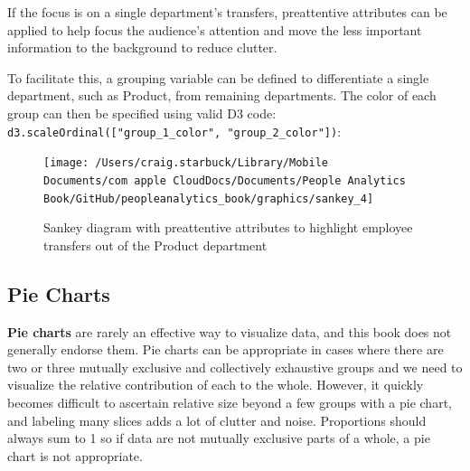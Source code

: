 \documentclass[
]{book}
\newenvironment{Shaded}{\begin{snugshade}}{\end{snugshade}}
\newcommand{\CommentTok}[1]{\textcolor[rgb]{0.56,0.35,0.01}{\textit{#1}}}
\newcommand{\FunctionTok}[1]{\textcolor[rgb]{0.00,0.00,0.00}{#1}}
\newcommand{\NormalTok}[1]{#1}
\newcommand{\OtherTok}[1]{\textcolor[rgb]{0.56,0.35,0.01}{#1}}
\newcommand{\SpecialCharTok}[1]{\textcolor[rgb]{0.00,0.00,0.00}{#1}}
\newcommand{\StringTok}[1]{\textcolor[rgb]{0.31,0.60,0.02}{#1}}
\begin{document}
If the focus is on a single department's transfers, preattentive attributes can be applied to help focus the audience's attention and move the less important information to the background to reduce clutter.

To facilitate this, a grouping variable can be defined to differentiate a single department, such as Product, from remaining departments. The color of each group can then be specified using valid D3 code: \texttt{d3.scaleOrdinal({[}"group\_1\_color",\ "group\_2\_color"{]})}:

\begin{Shaded}
\end{Shaded}

\begin{figure}

{\centering \texttt{[image: /Users/craig.starbuck/Library/Mobile Documents/com~apple~CloudDocs/Documents/People Analytics Book/GitHub/peopleanalytics\_book/graphics/sankey\_4]} 

}

\caption{Sankey diagram with preattentive attributes to highlight employee transfers out of the Product department}\label{fig:sankey-4}
\end{figure}

\hypertarget{pie-charts}{%
\subsection{Pie Charts}\label{pie-charts}}

\textbf{Pie charts} are rarely an effective way to visualize data, and this book does not generally endorse them. Pie charts can be appropriate in cases where there are two or three mutually exclusive and collectively exhaustive groups and we need to visualize the relative contribution of each to the whole. However, it quickly becomes difficult to ascertain relative size beyond a few groups with a pie chart, and labeling many slices adds a lot of clutter and noise. Proportions should always sum to 1 so if data are not mutually exclusive parts of a whole, a pie chart is not appropriate.
\end{document}
